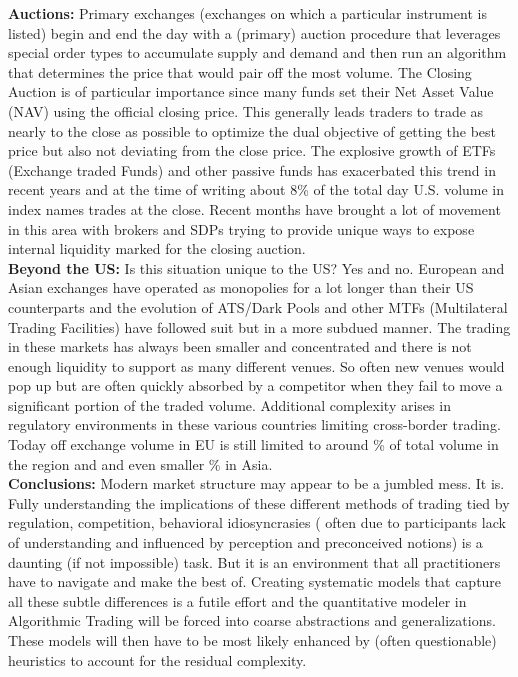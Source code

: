 \noindent\textbf{Auctions:} Primary exchanges (exchanges on which a particular instrument is listed) begin and end the day with a (primary) auction procedure that leverages special order types to accumulate supply and demand and then run an algorithm that determines the price that would pair off the most volume. The Closing Auction is of particular importance since many funds set their Net Asset Value (NAV) using the official closing price. This generally leads traders to trade as nearly to the close as possible to optimize the dual objective of getting the best price but also not deviating from the close price. The explosive growth of ETFs (Exchange traded Funds) and other passive funds has exacerbated this trend in recent years and at the time of writing about 8\% of the total day U.S. volume in index names trades at the close. Recent months have brought a lot of movement in this area with brokers and SDPs trying to provide unique ways to expose internal liquidity marked for the closing auction. \\
 
 
\noindent\textbf{Beyond the US:} Is this situation unique to the US? Yes and no. European and Asian exchanges have operated as monopolies for a lot longer than their US counterparts and the evolution of ATS/Dark Pools and other MTFs (Multilateral Trading Facilities) have followed suit but in a more subdued manner. The trading in these markets has always been smaller and concentrated and there is not enough liquidity to support as many different venues. So often new venues would pop up but are often quickly absorbed by a competitor when they fail to move a significant portion of the traded volume. Additional complexity arises in regulatory environments in these various countries limiting cross-border trading. Today off exchange volume in EU is still limited to around  \%  of total volume in the region and  and even smaller \% in Asia. \\


\noindent\textbf{Conclusions:} Modern market structure may appear to be a jumbled mess. It is. Fully understanding the implications of these different methods of trading tied by regulation, competition, behavioral idiosyncrasies ( often due to participants lack of understanding and influenced by perception and preconceived notions)  is a daunting (if not impossible) task. But it is an environment that all practitioners have to navigate and make the best of. Creating systematic models that capture all these subtle differences is a futile effort and the quantitative modeler in Algorithmic Trading will be forced into coarse abstractions and generalizations. These models will then have to be most likely enhanced by (often questionable) heuristics to account for the residual complexity. 


